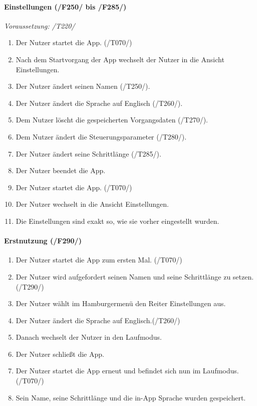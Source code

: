 \documentclass[a4paper,12pt]{article}
\begin{document}
      \paragraph{Einstellungen (/F250/ bis /F285/)}
      \textit{Voraussetzung: /T220/}
      \begin{enumerate}
        \item Der Nutzer startet die App. (/T070/)
        \item Nach dem Startvorgang der App wechselt der Nutzer in die Ansicht \glqq Einstellungen\grqq .
        \item Der Nutzer ändert seinen Namen (/T250/).
        \item Der Nutzer ändert die Sprache auf Englisch (/T260/).
        \item Dem Nutzer löscht die gespeicherten \Gls{Vorgangsdaten} (/T270/).
        \item Dem Nutzer ändert die \Gls{Steuerungsparameter} (/T280/).
        \item Der Nutzer ändert seine Schrittlänge (/T285/).
        \item Der Nutzer beendet die App.
        \item Der Nutzer startet die App. (/T070/)
        \item Der Nutzer wechselt in die Ansicht \glqq Einstellungen\grqq .
        \item Die Einstellungen sind exakt so, wie sie vorher eingestellt wurden.
      \end{enumerate}

      \paragraph{Erstnutzung (/F290/)}
      \begin{enumerate}
        \item Der Nutzer startet die App zum ersten Mal. (/T070/)
        \item Der Nutzer wird aufgefordert seinen Namen und seine Schrittlänge zu setzen. (/T290/)
        \item Der Nutzer wählt im Hamburgermenü den Reiter Einstellungen aus.
        \item Der Nutzer ändert die Sprache auf Englisch.(/T260/)
        \item Danach wechselt der Nutzer in den \glqq Laufmodus\grqq.
        \item Der Nutzer schließt die App.
        \item Der Nutzer startet die App erneut und befindet sich nun im \glqq Laufmodus\grqq. (/T070/)
        \item Sein Name, seine Schrittlänge und die in-App Sprache wurden gespeichert.
      \end{enumerate}
\end{document}
